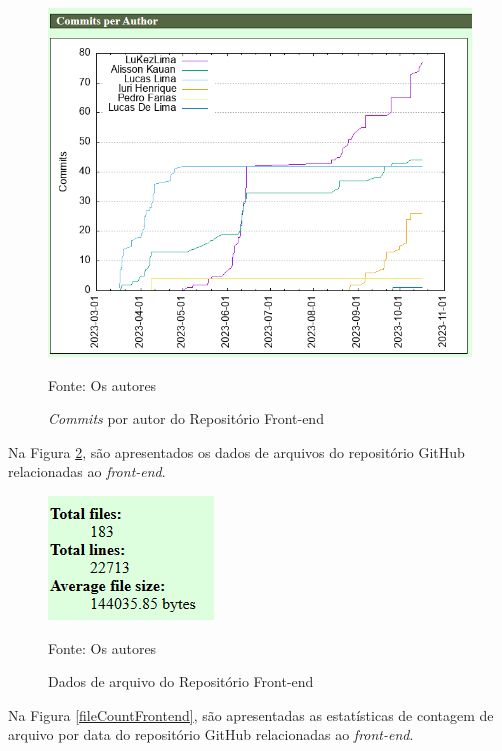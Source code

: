 \begin{apendicesenv}
\begin{figure}[H]
	\centering
	\includegraphics[scale=0.7]{./imagens/metricas/gitStatsFrontend/authors/commitPerAuthor.png}
	\caption{\textit{Commits} por autor do Repositório Front-end}
	Fonte: Os autores
    \label{commitPerAuthorFrontend}
\end{figure}

Na Figura \ref{filesFrontend}, são apresentados os dados de arquivos do repositório GitHub relacionadas ao \textit{front-end}.

\begin{figure}[H]
	\centering
	\includegraphics[scale=1]{./imagens/metricas/gitStatsFrontend/files/files.png}
	\caption{Dados de arquivo do Repositório Front-end}
	Fonte: Os autores
    \label{filesFrontend}
\end{figure}
\pagebreak

Na Figura \ref{fileCountFrontend}, são apresentadas as estatísticas de contagem de arquivo por data do repositório GitHub relacionadas ao \textit{front-end}.


\end{apendicesenv}

